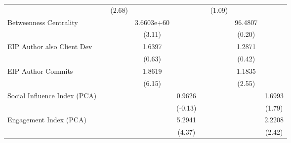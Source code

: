 {\begin{tabular}{l*{8}{c}}
                                   &                     &      (2.68)         &                     &                     &                     &      (1.09)         &                     &                     \\
[1em]
Betweenness Centrality             &                     &                     &  3.6603e+60\sym{***}&                     &                     &                     &     96.4807         &                     \\
                                   &                     &                     &      (3.11)         &                     &                     &                     &      (0.20)         &                     \\
[1em]
EIP Author also Client Dev         &                     &                     &      1.6397         &                     &                     &                     &      1.2871         &                     \\
                                   &                     &                     &      (0.63)         &                     &                     &                     &      (0.42)         &                     \\
[1em]
EIP Author Commits                 &                     &                     &      1.8619\sym{***}&                     &                     &                     &      1.1835\sym{**} &                     \\
                                   &                     &                     &      (6.15)         &                     &                     &                     &      (2.55)         &                     \\
[1em]
Social Influence Index (PCA)       &                     &                     &                     &      0.9626         &                     &                     &                     &      1.6993\sym{*}  \\
                                   &                     &                     &                     &     (-0.13)         &                     &                     &                     &      (1.79)         \\
[1em]
Engagement Index (PCA)             &                     &                     &                     &      5.2941\sym{***}&                     &                     &                     &      2.2208\sym{**} \\
                                   &                     &                     &                     &      (4.37)         &                     &                     &                     &      (2.42)         \\

\end{tabular}}
